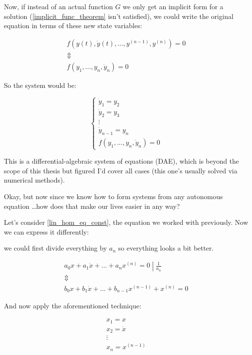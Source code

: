 Now, if instead of an actual function $G$ we only get an implicit form for a solution (\ref{implicit_func_theorem} isn't satisfied), we could write the original equation in terms of these new state variables:

\begin{gather*}
    f(y(t), \dot{y}(t),\dots,y^{(n-1)},y^{(n)})= 0 \\
    \Updownarrow \\
    f(y_1,\dots,y_n,\dot{y}_n) = 0
\end{gather*}

So the system would be:

\[
    \begin{cases}
        \dot{y}_1 = y_2     \\
        \dot{y}_2 = y_3     \\
        \vdots              \\
        \dot{y}_{n-1} = y_n \\
        f(y_1,\dots,y_n,\dot{y}_n) = 0
    \end{cases}
\]

This is a differential-algebraic system of equations (DAE), which is beyond the scope of this thesis but figured I'd cover all cases (this one's usually solved via numerical methods).

\vspace{10pt}

Okay, but now since we know how to form systems from any autonomous equation \dots how does that make our lives easier in any way?

Let's consider \ref{lin_hom_eq_const}, the equation we worked with previously. Now we can express it differently:


we could first divide everything by $a_{n}$ so everything looks a bit better.

\begin{gather*}
    \left. a_0 x + a_1\dot{x}+ \dots +a_{n} x^{(n)} = 0 \middle| \frac{1}{a_{n}} \right. \\
    \Updownarrow \\
    b_0 x + b_1\dot{x} + \dots + b_{n-1} x^{(n-1)} + x^{(n)} = 0
\end{gather*}

And now apply the aforementioned technique:

\begin{gather*}
    x_1 = x     \\
    x_2 = \dot{x} \\
    \vdots \\
    x_n = x^{(n-1)}
\end{gather*}

